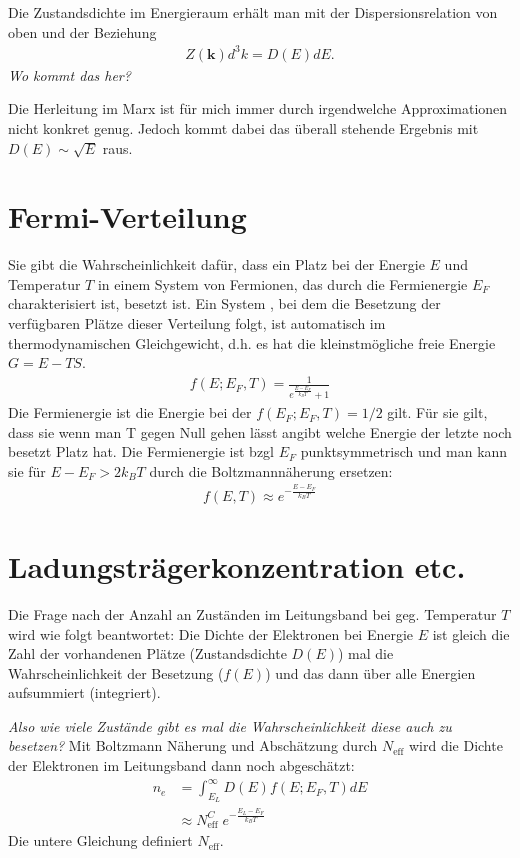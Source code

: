 \documentclass[paper=a4,10pt]{scrartcl}
\begin{document}
Die Zustandsdichte im Energieraum erhält man mit der Dispersionsrelation von oben und der Beziehung
\begin{align}
Z(\bm k) d^3k = D(E)dE.
\end{align} 
\textit{Wo kommt das her?}

Die Herleitung im Marx ist für mich immer durch irgendwelche Approximationen nicht konkret genug. Jedoch kommt dabei das überall stehende Ergebnis mit $D(E) \sim \sqrt{E}$ raus.

\section{Fermi-Verteilung}
Sie gibt die Wahrscheinlichkeit dafür, dass ein Platz bei der Energie $E$ und Temperatur $T$ in einem System von Fermionen, das durch die Fermienergie $E_F$ charakterisiert ist, besetzt ist.
Ein System , bei dem die Besetzung der verfügbaren Plätze dieser Verteilung folgt, ist automatisch im thermodynamischen Gleichgewicht, d.h. es hat die kleinstmögliche freie Energie $G = E-TS$.
\begin{align}
f(E;E_F, T) = \frac{1}{e^{\frac{E-E_F}{k_BT}}+1}
\end{align}
Die Fermienergie ist die Energie bei der $f(E_F; E_F, T) = 1/2$ gilt. Für sie gilt, dass sie wenn man T gegen Null gehen lässt angibt welche Energie der letzte noch besetzt Platz hat.
Die Fermienergie ist bzgl $E_F$ punktsymmetrisch und man kann sie für $E-E_F > 2k_BT$ durch die Boltzmannnäherung ersetzen:
\begin{align}
f(E,T) \approx e^{-\frac{E-E_F}{k_BT}}
\end{align}

\section{Ladungsträgerkonzentration etc.}
\label{seq:ladungskonz}
Die Frage nach der Anzahl an Zuständen im Leitungsband bei geg. Temperatur $T$ wird wie folgt beantwortet: Die Dichte der Elektronen bei Energie $E$ ist gleich die Zahl der vorhandenen Plätze (Zustandsdichte $D(E)$) mal die Wahrscheinlichkeit der Besetzung ($f(E)$) und das dann über alle Energien aufsummiert (integriert).

\textit{Also wie viele Zustände gibt es mal die Wahrscheinlichkeit diese auch zu besetzen?}
Mit Boltzmann Näherung und Abschätzung durch $N_{\text{eff}}$ wird die Dichte der Elektronen im Leitungsband dann noch abgeschätzt:
\begin{align}
n_e &= \int^{\infty}_{E_L} D(E) f(E; E_F, T) dE \label{eq:ne} \\ 
&\approx N^C_{\text{eff}} \;  e^{-\frac{E_L-E_F}{k_B T}} \label{eq:ne2}
\end{align}
Die untere Gleichung definiert $N_{\text{eff}}$.
\end{document}
